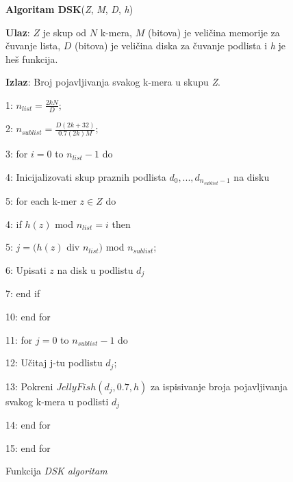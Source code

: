 \documentclass[12pt,oneside]{memoir}
\begin{document}
\begin{figure}[!ht]
\begin{tcolorbox}
\textbf{Algoritam DSK}(\textit{Z}, \textit{M}, \textit{D}, \textit{h})

\textbf{Ulaz}: $Z$ je skup od $N$ k-mera, $M$ (bitova) je veličina memorije za čuvanje lista, $D$ (bitova) je veličina diska za čuvanje podlista i \textit{h} je heš funkcija.

\textbf{Izlaz}: Broj pojavljivanja svakog k-mera u skupu \textit{Z}.

1: $n_{list} = \frac{2kN}{D}$;

2: $n_{sublist} = \frac{D(2k + 32)}{0.7(2k)M}$;

3: for $i = 0$ to $n_{list} - 1$ do

4:\hspace{1cm} Inicijalizovati skup praznih podlista ${d_0,..., d_{n_{sublist} - 1}}$ na disku

5:\hspace{1cm} for each k-mer $z \in Z$ do

4:\hspace{2cm} if $h(z)$ mod $n_{list} = i$ then

5:\hspace{3cm} $j = (h(z)$ div $n_{list})$ mod $n_{sublist}$;

6:\hspace{3cm} Upisati $z$ na disk u podlistu $d_j$

7:\hspace{2cm} end if

10:\hspace{1cm} end for

11:\hspace{1cm} for $j = 0$ to $n_{sublist} - 1$ do

12:\hspace{2cm} Učitaj j-tu podlistu $d_j$;

13:\hspace{2cm} Pokreni $JellyFish(d_j, 0.7, h)$ za ispisivanje broja pojavljivanja svakog k-mera u podlisti $d_j$

14:\hspace{1cm} end for

15: end for
\end{tcolorbox}
\caption{Funkcija \textit{DSK algoritam} \cite{WingKinSung}}
\label{box:DSK}
\end{figure}
\end{document}
